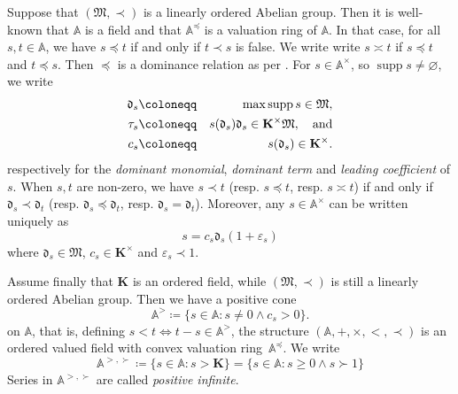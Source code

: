 \documentclass{article}
\newcommand{\assign}{\coloneqq}
\newcommand{\suchthat}{:}
\newcommand{\tmabbr}[1]{#1}
\newcommand{\tmem}[1]{{\em #1\/}}
\newcommand{\tmop}[1]{\ensuremath{\operatorname{#1}}}
\theoremstyle{remark}\newtheorem*{convention*}{Convention}
\begin{document}
Suppose that $(\mathfrak{M}, \prec)$ is a linearly ordered Abelian group. Then
it is well-known {\cite{Hahn1907}} that $\mathbb{A}$ is a field and
{\cite{Krull32}} that $\mathbb{A}^{\preccurlyeq}$ is a valuation ring of
$\mathbb{A}$. In that case, for all $s, t \in \mathbb{A}$, we have $s
\preccurlyeq t$\label{autolab10} if and only if $t \prec s$ is false. We write
write $s \asymp t$\label{autolab11} if $s \preccurlyeq t$ and $t \preccurlyeq
s$. Then $\preccurlyeq$ is a dominance relation as per
{\cite[Definition~3.1.1]{vdH:mt}}. For $s \in \mathbb{A}^{\times}$, so
$\tmop{supp} s \neq \varnothing$, we write\label{autolab12} \label{autolab13}
\begin{eqnarray*}
  \mathfrak{d}_s & \assign & \max \tmop{supp} s \in \mathfrak{M},\\
  \tau_s & \assign & s (\mathfrak{d}_s) \mathfrak{d}_s \in \mathbf{K}^{\times}
  \mathfrak{M}, \text{\quad and}\\
  c_s & \assign & s (\mathfrak{d}_s) \in \mathbf{K}^{\times} .
\end{eqnarray*}
respectively for the {\tmem{dominant monomial}}{},
{\tmem{dominant term}}{} and {\tmem{leading
coefficient}}{} of $s$. When $s, t$ are non-zero,
we have $s \prec t$ (resp. $s \preccurlyeq t$, resp. $s \asymp t$) if and only
if $\mathfrak{d}_s \prec \mathfrak{d}_t$ ({\tmabbr{resp.}} $\mathfrak{d}_s
\preccurlyeq \mathfrak{d}_t$, {\tmabbr{resp.}} $\mathfrak{d}_s
=\mathfrak{d}_t$). Moreover, any $s \in \mathbb{A}^{\times}$ can be written
uniquely as
\begin{equation}
  s = c_s \mathfrak{d}_s  (1 + \varepsilon_s) \label{eq-mult-dec}
\end{equation}
where $\mathfrak{d}_s \in \mathfrak{M}$, $c_s \in \mathbf{K}^{\times}$ and
$\varepsilon_s \prec 1$.

Assume finally that $\mathbf{K}$ is an ordered field, while $(\mathfrak{M},
\prec)$ is still a linearly ordered Abelian group. Then we have a positive
cone
\[ \text{$\mathbb{A}^{>} \assign \{ s \in \mathbb{A} \suchthat s \neq 0 \wedge
   c_s > 0 \}$.} \]
on $\mathbb{A}$, that is, defining $s < t \Longleftrightarrow t - s \in
\mathbb{A}^{>}$, the structure $(\mathbb{A}, +, \times, <, \prec)$ is an
ordered valued field with convex valuation ring~$\mathbb{A}^{\preccurlyeq}$.
We write\label{autolab14}
\[ \mathbb{A}^{>, \succ} \assign \{ s \in \mathbb{A} \suchthat s > \mathbf{K}
   \} = \{ s \in \mathbb{A} \suchthat s \geqslant 0 \wedge s \succ 1 \} \]
Series in $\mathbb{A}^{>, \succ}$ are called {\tmem{positive
infinite}}.{}{}{}
\end{document}

